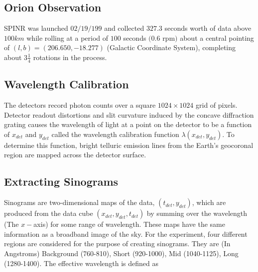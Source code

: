 \documentclass[oneside]{book}
\theoremstyle{definition}
\numberwithin{equation}{section}
\begin{document}
\subsection{Orion Observation}

SPINR was launched $02/19/199$ and collected $327.3$ seconds worth of data above $100 km$ while rolling at a period of $100$ seconds $(0.6$ rpm$)$ about a central pointing of $(l,b)=(206.650,-18.277)$ (Galactic Coordinate System), completing about $3\frac{1}{4}$ rotations in the process. 

\subsection{Wavelength Calibration}

The detectors record photon counts over a square $1024\times 1024$ grid of pixels. Detector readout distortions and slit curvature induced by the concave diffraction grating causes the wavelength of light at a point on the detector to be a function of $x_{det}$ and $y_{det}$ called the wavelength calibration function $\lambda(x_{det},y_{det})$. To determine this function, bright telluric emission lines from the Earth's geocoronal region are mapped across the detector surface.

\subsection{Extracting Sinograms}

Sinograms are two-dimensional maps of the data, $(t_{det},y_{det})$, which are produced from the data cube $(x_{det},y_{det},t_{det})$ by summing over the wavelength (The $x-$axis) for some range of wavelength. These maps have the same information as a broadband image of the sky. For the experiment, four different regions are considered for the purpose of creating sinograms. They are (In Angstroms) Background (760-810), Short (920-1000), Mid (1040-1125), Long (1280-1400). The effective wavelength is defined as
\end{document}
